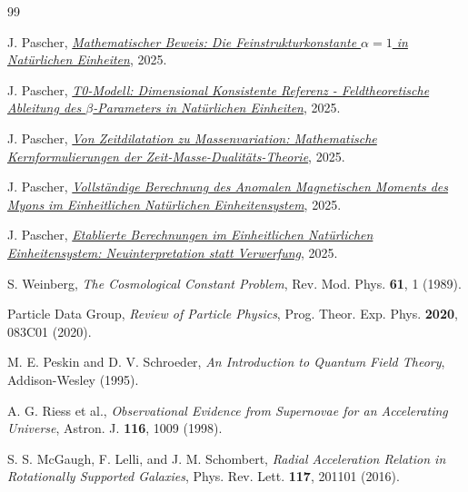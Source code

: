 	\begin{thebibliography}{99}
		
		J. Pascher, \href{https://github.com/jpascher/T0-Time-Mass-Duality/blob/main/2/pdf/ResolvingTheConstantsAlfaEn.pdf}{\textit{Mathematischer Beweis: Die Feinstrukturkonstante $\alpha = 1$ in Natürlichen Einheiten}}, 2025.
		
		J. Pascher, \href{https://github.com/jpascher/T0-Time-Mass-Duality/blob/main/2/pdf/DerivationVonBetaEn.pdf}{\textit{T0-Modell: Dimensional Konsistente Referenz - Feldtheoretische Ableitung des $\beta$-Parameters in Natürlichen Einheiten}}, 2025.
		
		J. Pascher, \href{https://github.com/jpascher/T0-Time-Mass-Duality/blob/main/2/pdf/MathZeitMasseLagrangeEn.pdf}{\textit{Von Zeitdilatation zu Massenvariation: Mathematische Kernformulierungen der Zeit-Masse-Dualitäts-Theorie}}, 2025.
		
		J. Pascher, \href{https://github.com/jpascher/T0-Time-Mass-Duality/blob/main/2/pdf/CompleteMuon_g-2_AnalysisEn.pdf}{\textit{Vollständige Berechnung des Anomalen Magnetischen Moments des Myons im Einheitlichen Natürlichen Einheitensystem}}, 2025.
		
		J. Pascher, \href{https://github.com/jpascher/T0-Time-Mass-Duality/blob/main/2/pdf/PragmaticApproachT0-ModelEn.pdf}{\textit{Etablierte Berechnungen im Einheitlichen Natürlichen Einheitensystem: Neuinterpretation statt Verwerfung}}, 2025.
		
		S. Weinberg, \textit{The Cosmological Constant Problem}, Rev. Mod. Phys. \textbf{61}, 1 (1989).
		
		Particle Data Group, \textit{Review of Particle Physics}, Prog. Theor. Exp. Phys. \textbf{2020}, 083C01 (2020).
		
		M. E. Peskin and D. V. Schroeder, \textit{An Introduction to Quantum Field Theory}, Addison-Wesley (1995).
		
		A. G. Riess et al., \textit{Observational Evidence from Supernovae for an Accelerating Universe}, Astron. J. \textbf{116}, 1009 (1998).
		
		S. S. McGaugh, F. Lelli, and J. M. Schombert, \textit{Radial Acceleration Relation in Rotationally Supported Galaxies}, Phys. Rev. Lett. \textbf{117}, 201101 (2016).
		

\end{thebibliography}
